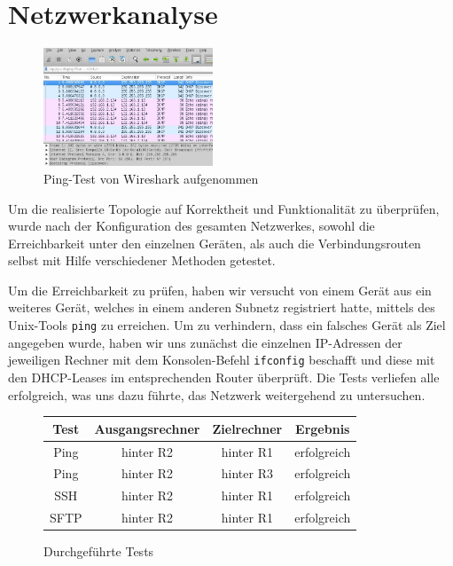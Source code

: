 \documentclass[11pt,a4paper]{article}
\begin{document}
\section{Netzwerkanalyse}
\begin{figure}
    \centering
    \includegraphics[width = 0.45\textwidth]{wireshark1.jpeg}
    \caption{\footnotesize{Ping-Test von Wireshark aufgenommen}}
  \end{figure}
  Um die realisierte Topologie auf Korrektheit und Funktionalität zu
  überprüfen, wurde nach der Konfiguration des gesamten Netzwerkes,
  sowohl die Erreichbarkeit unter den einzelnen Geräten, als auch die
  Verbindungsrouten selbst mit Hilfe verschiedener Methoden getestet.
  \par
  Um die Erreichbarkeit zu prüfen, haben wir versucht von einem Gerät
  aus ein weiteres Gerät, welches in einem anderen Subnetz registriert
  hatte, mittels des Unix-Tools \texttt{ping} zu erreichen. Um zu
  verhindern, dass ein falsches Gerät als Ziel angegeben wurde, haben
  wir uns zunächst die einzelnen IP-Adressen der jeweiligen Rechner mit
  dem Konsolen-Befehl \texttt{ifconfig} beschafft und diese mit den
  DHCP-Leases im entsprechenden Router überprüft. Die Tests verliefen
  alle erfolgreich, was uns dazu führte, das Netzwerk weitergehend zu
  untersuchen.
  \begin{figure}[ht]
    \begin{tabular}{|c|c|c|c|}
      \hline 
      Test & Ausgangsrechner & Zielrechner & Ergebnis \\ 
      \hline 
      Ping & hinter R2 & hinter R1 & erfolgreich \\ 
      \hline 
      Ping & hinter R2 & hinter R3 & erfolgreich \\ 
      \hline 
      SSH & hinter R2 & hinter R1 & erfolgreich \\ 
      \hline 
      SFTP & hinter R2 & hinter R1 & erfolgreich \\ 
      \hline 
    \end{tabular} 
  \centering
  \caption{Durchgeführte Tests}
\end{figure}
\end{document}
